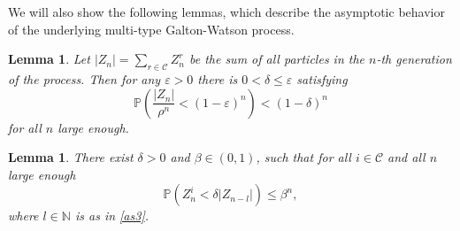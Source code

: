 \documentclass[12pt]{article}
\numberwithin{equation}{section}
\newtheorem{lemma}[theorem]{Lemma}
\begin{document}
    We will also show the following lemmas, which describe the asymptotic behavior of the underlying multi-type Galton-Watson process.
         \begin{lemma}\label{lemma}
         Let $|Z_n| = \sum_{r \in \mathcal{C}} Z^r_n$ be the sum of all particles in the $n$-th generation of the process. Then for any $\varepsilon > 0$ there is $ 0< \delta \leq \varepsilon$ satisfying
         \[
         \mathbb{P} \left(\frac{|Z_n|} {\rho^n}  <  {(1-\varepsilon)^n} \right) < (1-\delta)^{ n}
         \]
         for all $n$ large enough. 
     \end{lemma}

     \begin{lemma}\label{lemma2}
     There exist $\delta >0$ and $\beta \in (0,1)$, such that for all $i \in \mathcal{C}$ and all $n$ large enough 
     \[
     \mathbb{P}(Z_n^i < \delta |Z_{n-l}|) \leq \beta^n,
     \]where $l \in \mathbb{N}$ is as in \eqref{as3}.
     \end{lemma}
    
\end{document}
